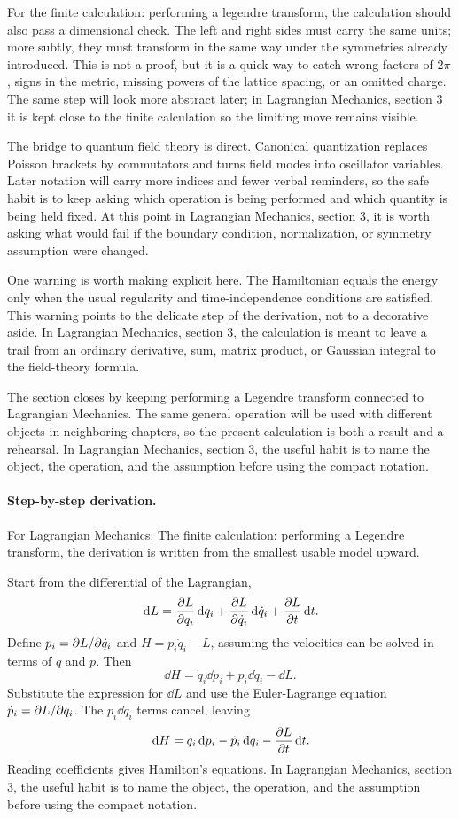 For the finite calculation: performing a legendre transform, the calculation should also pass a dimensional check.  The left and right sides must carry the same units; more subtly, they must transform in the same way under the symmetries already introduced.  This is not a proof, but it is a quick way to catch wrong factors of \(2\pi\), signs in the metric, missing powers of the lattice spacing, or an omitted charge.  The same step will look more abstract later; in Lagrangian Mechanics, section 3 it is kept close to the finite calculation so the limiting move remains visible.

The bridge to quantum field theory is direct.  Canonical quantization replaces Poisson brackets by commutators and turns field modes into oscillator variables.  Later notation will carry more indices and fewer verbal reminders, so the safe habit is to keep asking which operation is being performed and which quantity is being held fixed.  At this point in Lagrangian Mechanics, section 3, it is worth asking what would fail if the boundary condition, normalization, or symmetry assumption were changed.

One warning is worth making explicit here.  The Hamiltonian equals the energy only when the usual regularity and time-independence conditions are satisfied.  This warning points to the delicate step of the derivation, not to a decorative aside.  In Lagrangian Mechanics, section 3, the calculation is meant to leave a trail from an ordinary derivative, sum, matrix product, or Gaussian integral to the field-theory formula.

The section closes by keeping performing a Legendre transform connected to Lagrangian Mechanics.  The same general operation will be used with different objects in neighboring chapters, so the present calculation is both a result and a rehearsal.  In Lagrangian Mechanics, section 3, the useful habit is to name the object, the operation, and the assumption before using the compact notation.



\paragraph{Step-by-step derivation.}

For Lagrangian Mechanics: The finite calculation: performing a Legendre transform, the derivation is written from the smallest usable model upward.

Start from the differential of the Lagrangian,
\[
  \,\mathrm d L=\frac{\partial L}{\partial q_i}\,\mathrm d q_i+\frac{\partial L}{\partial\dot q_i}\,\mathrm d\dot q_i+\frac{\partial L}{\partial t}\,\mathrm d t.
\]
Define \(p_i=\partial L/\partial\dot q_i\) and \(H=p_i\dot q_i-L\), assuming the velocities can be solved in terms of \(q\) and \(p\).  Then
\[
  \dd H=\dot q_i\dd p_i+p_i\dd\dot q_i-\dd L.
\]
Substitute the expression for \(\dd L\) and use the Euler-Lagrange equation \(\dot p_i=\partial L/\partial q_i\).  The \(p_i\dd\dot q_i\) terms cancel, leaving
\[
  \,\mathrm d H=\dot q_i\,\mathrm d p_i-\dot p_i\,\mathrm d q_i-\frac{\partial L}{\partial t}\,\mathrm d t.
\]
Reading coefficients gives Hamilton's equations.  In Lagrangian Mechanics, section 3, the useful habit is to name the object, the operation, and the assumption before using the compact notation.

